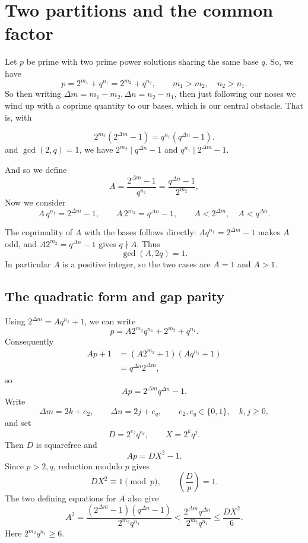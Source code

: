 \documentclass[11pt]{article}
\begin{document}
\clearpage
{\small\tableofcontents}
\clearpage
\section{Two partitions and the common factor}
\label{sec:setup}

Let $p$ be prime with two prime power solutions sharing the same base $q$. So, we have
\[
p = 2^{m_1} + q^{n_1} = 2^{m_2} + q^{n_2}, \qquad m_1 > m_2, \quad n_2 > n_1.
\]
So then writing $\Delta m = m_1 - m_2, \Delta n = n_2 - n_1$, then just following our noses we
wind up with a coprime quantity to our bases, which is our central obstacle. That is, with

\[
2^{m_2}\left(2^{\Delta m} - 1\right) = q^{n_1}\left(q^{\Delta n} - 1\right).
\]
and  $\gcd(2,q) = 1$, we have $2^{m_2} \mid q^{\Delta n} - 1$ and $q^{n_1} \mid 2^{\Delta m} - 1$.

And so we define
\[
A = \frac{2^{\Delta m} - 1}{q^{n_1}} = \frac{q^{\Delta n} - 1}{2^{m_2}},
\]
Now we consider
\[
A\,q^{n_1} = 2^{\Delta m} - 1, \qquad A\,2^{m_2} = q^{\Delta n} - 1, \qquad A < 2^{\Delta m}, \quad A < q^{\Delta n}.
\]

The coprimality of $A$ with the bases follows directly:
$Aq^{n_1}=2^{\Delta m}-1$ makes $A$ odd, and
$A2^{m_2}=q^{\Delta n}-1$ gives $q\nmid A$. Thus
\[
\gcd(A,2q)=1.
\]
In particular $A$ is a positive integer, so the two cases are $A=1$ and
$A>1$.

\subsection{The quadratic form and gap parity}

Using $2^{\Delta m}=Aq^{n_1}+1$, we can write
\[
p=A2^{m_2}q^{n_1}+2^{m_2}+q^{n_1}.
\]
Consequently
\begin{align*}
Ap+1
 &= (A2^{m_2}+1)(Aq^{n_1}+1)\\
 &= q^{\Delta n}2^{\Delta m},
\end{align*}
so
\[
\boxed{Ap=2^{\Delta m}q^{\Delta n}-1.}
\]
Write
\[
\Delta m=2k+e_2,\qquad \Delta n=2j+e_q,
\qquad e_2,e_q\in\{0,1\},\quad k,j\geq0,
\]
and set
\[
D=2^{e_2}q^{e_q},\qquad X=2^kq^j.
\]
Then $D$ is squarefree and
\[
\boxed{Ap=DX^2-1.}
\]
Since $p>2,q$, reduction modulo $p$ gives
\[
DX^2\equiv1\pmod p,\qquad
\left(\frac{D}{p}\right)=1.
\]
The two defining equations for $A$ also give
\begin{equation}\label{eq:A-size}
A^2
 =\frac{(2^{\Delta m}-1)(q^{\Delta n}-1)}{2^{m_2}q^{n_1}}
 <\frac{2^{\Delta m}q^{\Delta n}}{2^{m_2}q^{n_1}}
 \leq\frac{DX^2}{6}.
\end{equation}
Here $2^{m_2}q^{n_1}\geq6$.
\end{document}
